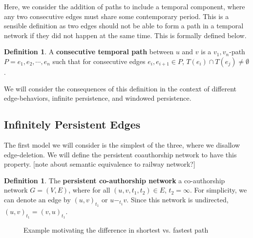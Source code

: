 \documentclass{article}
\theoremstyle{definition}
\newtheorem{defn}[thm]{Definition}
\numberwithin{thm}{subsection}
\begin{document}
Here, we consider the addition of paths to include a temporal component, where
any two consecutive edges must share some contemporary period. This is a sensible
definition as two edges should not be able to form a path in a temporal network
if they did not happen at the same time. This is formally defined below.

\begin{defn}
  \label{defn:cons_temp_path}
  A \textbf{consecutive temporal path} between $u$ and $v$ is a $v_1,v_n$-path
  $P = e_1, e_2, \cdots, e_n$ such that for consecutive edges $e_i,e_{i+1} \in P$,
  $T(e_i) \cap T(e_j) \neq \emptyset$.
\end{defn}

We will consider the consequences of this definition in the context of different
edge-behaviors, infinite persistence, and windowed persistence.

\subsection{Infinitely Persistent Edges}

The first model we will consider is the simplest of the three, where we disallow
edge-deletion. We will define the persistent coauthorship network to have this
property. [note about semantic equivalence to railway network?]

\begin{defn}
  The \textbf{persistent co-authorship network} a co-authorship network $G = (V,E)$,
  where for all $(u,v,t_1,t_2) \in E$, $t_2 = \infty$. For simplicity, we can
  denote an edge by $(u,v)_{t_1}$ or $u -_{t_1} v$. Since this network is
  undirected, $(u,v)_{t_1} = (v,u)_{t_1}$.
\end{defn}

\begin{figure}[ht] \centering
  \caption{Example motivating the difference in shortest vs. fastest path}
  \label{fig:infinite_edge_ex}
\end{figure}
\end{document}
